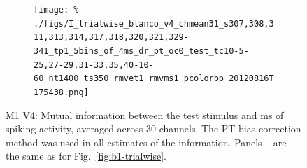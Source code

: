 \begin{figure}[htbp]
\begin{subfigure}[b]{0.5\linewidth}
        \centering
        \caption{\small{}}
        \label{fig:b4-5x4tp1}
        \texttt{[image: \%
./figs/I\_trialwise\_blanco\_v4\_chmean31\_s307,308,311,313,314,317,318,320,321,329-341\_tp1\_5bins\_of\_4ms\_dr\_pt\_oc0\_test\_tc10-5-25,27-29,31-33,35,40-10-60\_nt1400\_ts350\_rmvet1\_rmvms1\_pcolorbp\_20120816T175438.png]}
    \end{subfigure}
    \caption{\small{}M1 V4: Mutual information between the test stimulus and \unit[20]{ms} of spiking activity, averaged across 30 channels.
The PT bias correction method was used in all estimates of the information.
Panels -- are the same as for Fig.~\ref{fig:b1-trialwise}.
}
    \label{fig:b4-trialwise}
\end{figure}




